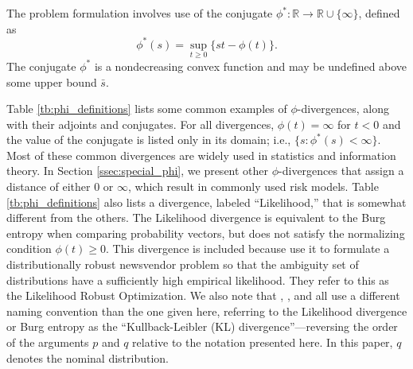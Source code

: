 \documentclass[12pt]{article}
\newcommand{\R}{{\mathbb{R}}}
\theoremstyle{plain}
\theoremstyle{definition}
\theoremstyle{remark}
\begin{document}
The problem formulation involves use of the conjugate $\phi^* : \R \rightarrow \R \cup \{\infty\}$, defined as
\begin{equation} \label{eq:conjugate}
	\phi^*(s) = \sup_{t \geq 0} \{st - \phi(t)\}.
\end{equation}
The conjugate $\phi^*$ is a nondecreasing convex function and may be undefined above some upper bound $\bar{s}$.

Table \ref{tb:phi_definitions} lists some common examples of $\phi$-divergences, along with their adjoints and conjugates.
For all divergences, $\phi(t) = \infty$ for $t < 0$ and the value of the conjugate is listed only in its domain; i.e., $\{s : \phi^*(s) < \infty\}$.
Most of these common divergences are widely used in statistics and information theory.
In Section \ref{ssec:special_phi}, we present other $\phi$-divergences that assign a distance of either $0$ or $\infty$, which result in commonly used risk models.
Table \ref{tb:phi_definitions} also lists a divergence, labeled ``Likelihood,'' that is somewhat different from the others.
The Likelihood divergence is equivalent to the Burg entropy when comparing probability vectors, but does not satisfy the normalizing condition $\phi(t) \geq 0$.
This divergence is included because \citet{wang2010likelihood} use it to formulate a distributionally robust newsvendor problem so that the ambiguity set of distributions have a sufficiently high empirical likelihood. 
They refer to this as the Likelihood Robust Optimization. 
We also note that \citep{calafiore2007ambiguous}, \citep{hukullback}, and \citep{wang2010likelihood} all use a different naming convention than the one given here, referring to the Likelihood divergence or Burg entropy as the ``Kullback-Leibler (KL) divergence''---reversing the order of the arguments $p$ and $q$ relative to the notation presented here.
In this paper, $q$ denotes the nominal distribution. 
\end{document}
